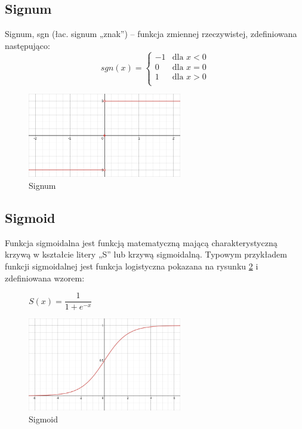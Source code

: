 \documentclass{article}
\begin{document}
\subsection{Signum}
Signum, sgn (łac. signum „znak”) – funkcja zmiennej rzeczywistej, zdefiniowana następująco:
\begin{equation}
	sgn(x) = 
	\begin{cases}
		-1 & \text{dla $x < 0$}\\
		0 & \text{dla $x = 0$}\\
		1 & \text{dla $x > 0$}\\
	\end{cases}    
\end{equation}

\begin{figure}[H]
	\centering
	\includegraphics[width=0.6\textwidth,keepaspectratio=true]{Signum}
	\caption{
		Signum
	}
	\label{Signum}
\end{figure}


\subsection{Sigmoid}
Funkcja sigmoidalna jest funkcją matematyczną mającą charakterystyczną krzywą w kształcie litery „S” lub krzywą sigmoidalną.
Typowym przykładem funkcji sigmoidalnej jest funkcja logistyczna pokazana na rysunku \ref{Sigmoid} i zdefiniowana wzorem: 



\begin{figure}[H]
	\begin{center}
		$S(x) = \dfrac{1}{1 + e^{-x}}$
	\end{center}

	\centering
	\includegraphics[width=0.6\textwidth,keepaspectratio=true]{Sigmoid}
	\caption{
		Sigmoid
	}
	\label{Sigmoid}
\end{figure}
\end{document}

